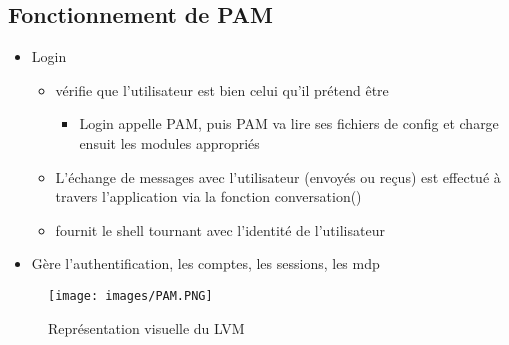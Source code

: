 \documentclass[a4paper]{article}
\begin{document}
      \subsection{Fonctionnement de PAM}
      \begin{itemize}[label = \textbullet, font = \Large]
        \item Login
        \begin{itemize}[label=, font=\scriptsize] 
          \item vérifie que l'utilisateur est bien celui qu'il prétend être
          \begin{itemize}
            \item Login appelle PAM, puis PAM va lire ses fichiers de config et charge ensuit les modules appropriés
          \end{itemize}
          \item  L’échange de messages avec l’utilisateur (envoyés ou reçus) est effectué à travers l’application via la fonction conversation()
          \item fournit le shell tournant avec l'identité de l'utilisateur
        \end{itemize}
        \item Gère l'authentification, les comptes, les sessions, les mdp
      \end{itemize}

      \begin{figure}[H]
        \centering
        \texttt{[image: images/PAM.PNG]}
        \caption{Représentation visuelle du LVM}
      \end{figure}
\end{document}
